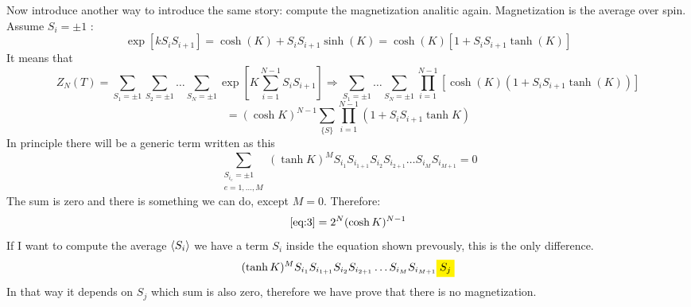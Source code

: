 \documentclass[../main/main.tex]{subfiles}
\begin{document}
Now introduce another way to introduce the same story: compute the magnetization analitic again. Magnetization is the average over spin. Assume \( S_i = \pm 1 \) :
\begin{equation}
  \exp [ k S_i S_{i+1}] = \cosh ( K) + S_i S_{i+1} \sinh (K) = \cosh (K) [1+ S_i S_{i+1} \tanh (K)]
\end{equation}
It means that
\begin{equation}
  Z_N (T) = \sum_{S_1 = \pm 1}^{} \sum_{S_2 = \pm 1}^{} \dots  \sum_{S_N = \pm 1}^{} \exp [
  K  \sum_{i=1}^{N-1} S_i S_{i+1}  ]  \Rightarrow  \sum_{S_1 = \pm 1}^{} \dots  \sum_{S_N = \pm 1}^{} \prod_{i=1}^{N-1} [ \cosh (K) (1+ S_i S_{i+1} \tanh (K))]
\end{equation}
\begin{equation}
  = (\cosh K)^{N-1} \sum_{\{S\}}^{}  \prod_{i=1}^{N-1} ( 1 + S_i S_{i+1} \tanh K )
  \label{eq:3}
\end{equation}
In principle there will be a generic term written as this
\begin{equation}
  \sum_{ \substack{ S_{i_e} = \pm 1\\ e= 1, \dots, M} }^{}  (\tanh K )^M S_{i_1} S_{i_{1+1}} S_{i_2} S_{i_{2+1}} \dots S_{i_M} S_{i_{M+1}} = 0
\end{equation}
The sum is zero and there is something we can do, except \( M=0 \).
Therefore:
\begin{equation}
  \eqref{eq:3} = 2^N (\cosh K)^{N-1}
\end{equation}
If I want to compute the average \( \expval{S_i}  \) we have a term \( S_i \) inside the equation shown prevously, this is the  only difference.
\begin{equation}
  (\tanh K)^M S_{i_1} S_{i_{1+1}} S_{i_2} S_{i_{2+1}} \dots S_{i_M} S_{i_{M+1}} \mathcolorbox{yellow}{S_j}
\end{equation}
In that way it depends on \( S_j \) which sum is also zero, therefore we have prove that there is no magnetization.
\end{document}
